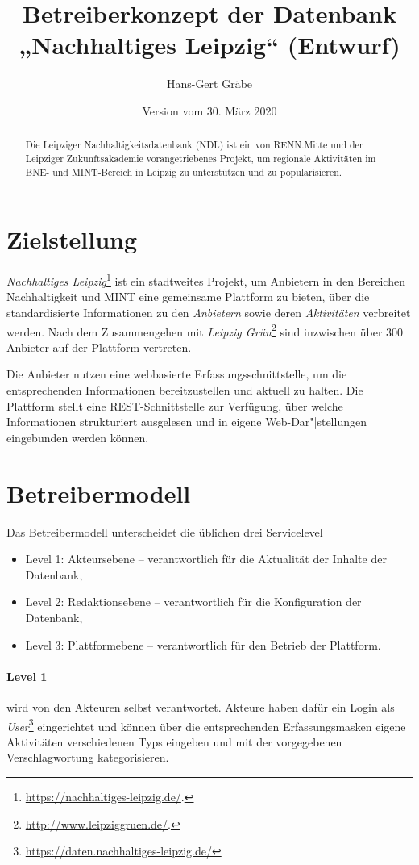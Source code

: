 \documentclass[a4paper,11pt]{article}
\title{Betreiberkonzept der Datenbank\\ „Nachhaltiges Leipzig“ (Entwurf)}
\author{Hans-Gert Gräbe}
\date{Version vom 30. März 2020}
\begin{document}
\maketitle
\begin{abstract}
  Die Leipziger Nachhaltigkeitsdatenbank (NDL) ist ein von RENN.Mitte und der
  Leipziger Zukunftsakademie vorangetriebenes Projekt, um regionale
  Aktivitäten im BNE- und MINT-Bereich in Leipzig zu unterstützen und zu
  popularisieren.
\end{abstract}
\tableofcontents 
\newpage

\section{Zielstellung}

\emph{Nachhaltiges Leipzig}\footnote{\url{https://nachhaltiges-leipzig.de/}.}
ist ein stadtweites Projekt, um Anbietern in den Bereichen Nachhaltigkeit und
MINT eine gemeinsame Plattform zu bieten, über die standardisierte
Informationen zu den \emph{Anbietern} sowie deren \emph{Aktivitäten}
verbreitet werden.  Nach dem Zusammengehen mit \emph{Leipzig
  Grün}\footnote{\url{http://www.leipziggruen.de/}.} sind inzwischen über 300
Anbieter auf der Plattform vertreten. 

Die Anbieter nutzen eine webbasierte Erfassungsschnittstelle, um die
entsprechenden Informationen bereitzustellen und aktuell zu halten.  Die
Plattform stellt eine REST-Schnittstelle zur Verfügung, über welche
Informationen strukturiert ausgelesen und in eigene Web-Dar"|stellungen
eingebunden werden können.

\section{Betreibermodell}

Das Betreibermodell unterscheidet die üblichen drei Servicelevel
\begin{itemize}
\item Level 1: Akteursebene -- verantwortlich für die Aktualität der Inhalte
  der Datenbank,
\item Level 2: Redaktionsebene -- verantwortlich für die Konfiguration der
  Datenbank,
\item Level 3: Plattformebene -- verantwortlich für den Betrieb der
  Plattform. 
\end{itemize}
\paragraph{Level 1}
wird von den Akteuren selbst verantwortet. Akteure haben dafür ein Login als
\emph{User}\footnote{\url{https://daten.nachhaltiges-leipzig.de/}}
eingerichtet und können über die entsprechenden Erfassungsmasken eigene
Aktivitäten verschiedenen Typs eingeben und mit der vorgegebenen
Verschlagwortung kategorisieren.
\end{document}
